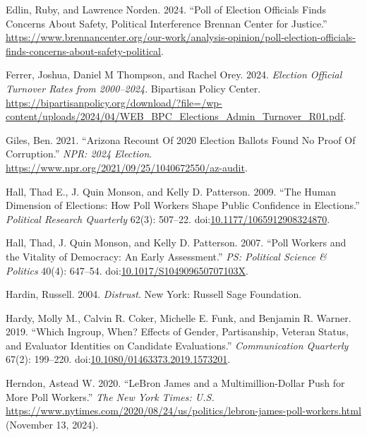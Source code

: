 \documentclass[
  12pt,
  letterpaper,
]{article}
\newlength{\cslhangindent}
\newenvironment{CSLReferences}[2] %
 {\begin{list}{}{%
  \setlength{\itemindent}{0pt}
  \setlength{\leftmargin}{0pt}
  \setlength{\parsep}{0pt}
  \ifodd #1
   \setlength{\leftmargin}{\cslhangindent}
   \setlength{\itemindent}{-1\cslhangindent}
  \fi
  \setlength{\itemsep}{#2\baselineskip}}}
 {\end{list}}
\begin{document}
\begin{CSLReferences}{1}{1}
Edlin, Ruby, and Lawrence Norden. 2024. {``Poll of {Election Officials
Finds Concerns About Safety}, {Political Interference} \textbar{}
{Brennan Center} for {Justice}.''}
\url{https://www.brennancenter.org/our-work/analysis-opinion/poll-election-officials-finds-concerns-about-safety-political}.

Ferrer, Joshua, Daniel M Thompson, and Rachel Orey. 2024. \emph{Election
{Official Turnover Rates} from 2000--2024}. Bipartisan Policy Center.
\url{https://bipartisanpolicy.org/download/?file=/wp-content/uploads/2024/04/WEB_BPC_Elections_Admin_Turnover_R01.pdf}.

Giles, Ben. 2021. {``Arizona {Recount Of} 2020 {Election Ballots Found
No Proof Of Corruption}.''} \emph{NPR: 2024 Election}.
\url{https://www.npr.org/2021/09/25/1040672550/az-audit}.

Hall, Thad E., J. Quin Monson, and Kelly D. Patterson. 2009. {``The
{Human Dimension} of {Elections}: {How Poll Workers Shape Public
Confidence} in {Elections}.''} \emph{Political Research Quarterly}
62(3): 507--22.
doi:\href{https://doi.org/10.1177/1065912908324870}{10.1177/1065912908324870}.

Hall, Thad, J. Quin Monson, and Kelly D. Patterson. 2007. {``Poll
{Workers} and the {Vitality} of {Democracy}: {An Early Assessment}.''}
\emph{PS: Political Science \& Politics} 40(4): 647--54.
doi:\href{https://doi.org/10.1017/S104909650707103X}{10.1017/S104909650707103X}.

Hardin, Russell. 2004. \emph{Distrust}. New York: Russell Sage
Foundation.

Hardy, Molly M., Calvin R. Coker, Michelle E. Funk, and Benjamin R.
Warner. 2019. {``Which Ingroup, When? {Effects} of Gender, Partisanship,
Veteran Status, and Evaluator Identities on Candidate Evaluations.''}
\emph{Communication Quarterly} 67(2): 199--220.
doi:\href{https://doi.org/10.1080/01463373.2019.1573201}{10.1080/01463373.2019.1573201}.

Herndon, Astead W. 2020. {``{LeBron James} and a {Multimillion-Dollar
Push} for {More Poll Workers}.''} \emph{The New York Times: U.S.}
\url{https://www.nytimes.com/2020/08/24/us/politics/lebron-james-poll-workers.html}
(November 13, 2024).


\end{CSLReferences}
\end{document}
